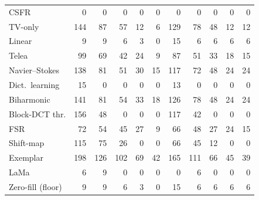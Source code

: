 \documentclass[11pt]{article}
\begin{document}
\begin{table}[htbp]
\begin{tabular}{@{}l*{10}{r}@{}}
\midrule
CSFR & 0 & 0 & 0 & 0 & 0 & 0 & 0 & 0 & 0 & 0 \\
TV-only & 144 & 87 & 57 & 12 & 6 & 129 & 78 & 48 & 12 & 12 \\
Linear & 9 & 9 & 6 & 3 & 0 & 15 & 6 & 6 & 6 & 6 \\
Telea & 99 & 69 & 42 & 24 & 9 & 87 & 51 & 33 & 18 & 15 \\
Navier--Stokes & 138 & 81 & 51 & 30 & 15 & 117 & 72 & 48 & 24 & 24 \\
Dict.\ learning & 15 & 0 & 0 & 0 & 0 & 13 & 0 & 0 & 0 & 0 \\
Biharmonic & 141 & 81 & 54 & 33 & 18 & 126 & 78 & 48 & 24 & 24 \\
Block-DCT thr. & 156 & 48 & 0 & 0 & 0 & 117 & 42 & 0 & 0 & 0 \\
FSR & 72 & 54 & 45 & 27 & 9 & 66 & 48 & 27 & 24 & 15 \\
Shift-map & 115 & 75 & 26 & 0 & 0 & 66 & 45 & 12 & 0 & 0 \\
Exemplar & 198 & 126 & 102 & 69 & 42 & 165 & 111 & 66 & 45 & 39 \\
LaMa & 6 & 9 & 0 & 0 & 0 & 0 & 6 & 0 & 0 & 0 \\
\midrule
Zero-fill (floor) & 9 & 9 & 6 & 3 & 0 & 15 & 6 & 6 & 6 & 6 \\
\bottomrule
\end{tabular}
\end{table}
\end{document}
